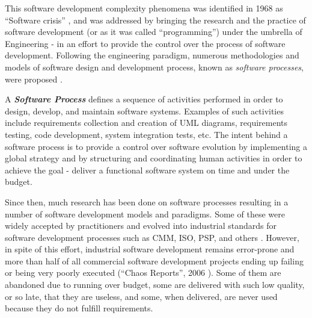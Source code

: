 This software development complexity phenomena was identified in 1968 as ``Software crisis'' 
\cite{naur_crisis_68}, and was addressed by bringing the research and the practice of software development 
(or as it was called ``programming'') under the umbrella of Engineering - in an effort to provide 
the control over the process of software development. 
Following the engineering paradigm, numerous methodologies and models of software design and development 
process, known as \textit{software processes}, were proposed \cite{citeulike:10002165}.

\begin{defn}\label{def_process}
A \textbf{\textit{Software Process}} defines a sequence of activities performed in order 
to design, develop, and maintain software systems.
Examples of such activities include requirements collection and creation of UML diagrams, 
requirements testing, code development,  system integration tests, etc. The intent behind a software process is 
to provide a control over software evolution by implementing a global strategy and by structuring
and coordinating human activities in order to achieve the goal - deliver a functional software system 
on time and under the budget. 
\end{defn}

Since then, much research has been done on software processes resulting in a number
of software development models and paradigms. Some of these were widely accepted by practitioners 
and evolved into industrial standards for software development processes such as CMM, ISO, PSP, 
and others \cite{citeulike:5043104}. However, in spite of this effort, industrial software 
development remains error-prone and more than half of all 
commercial software development projects ending up failing or being very poorly executed 
(``Chaos Reports'', 2006 \cite{chaos2006}). Some of them are abandoned due to running 
over budget, some are delivered with such low quality, or so late, that they are useless, and some, 
when delivered, are never used because they do not fulfill requirements. 

